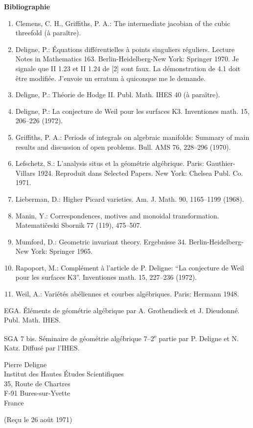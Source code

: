 \documentclass[10pt]{article}
\begin{document}
\begin{center}
\bfseries Bibliographie
\end{center}
\begin{enumerate}[label=\arabic*.]
\item Clemens, C. H., Griffiths, P. A.: The intermediate jacobian of the cubic threefold (à paraître).
\item Deligne, P.: Équations différentielles à points singuliers réguliers. Lecture Notes in Mathematics 163. Berlin-Heidelberg-New York: Springer 1970. Je signale que II 1.23 et II 1.24 de [2] sont faux. La démonstration de 4.1 doit être modifiée. J'envoie un erratum à quiconque me le demande.
\item Deligne, P.: Théorie de Hodge II. Publ. Math. IHES 40 (à paraître).
\item Deligne, P.: La conjecture de Weil pour les surfaces K3. Inventiones math. 15, 206--226 (1972).
\item Griffiths, P. A.: Periods of integrals on algebraic manifolds: Summary of main results and discussion of open problems. Bull. AMS 76, 228--296 (1970).
\item Lefschetz, S.: L'analysis situs et la géométrie algébrique. Paris: Gauthier-Villars 1924. Reproduit dans Selected Papers. New York: Chelsea Publ. Co. 1971.
\item Lieberman, D.: Higher Picard varieties. Am. J. Math. 90, 1165--1199 (1968).
\item Manin, Y.: Correspondences, motives and monoidal transformation. Matematičeski Sbornik 77 (119), 475--507.
\item Mumford, D.: Geometric invariant theory. Ergebnisse 34. Berlin-Heidelberg-New York: Springer 1965.
\item Rapoport, M.: Complément à l'article de P. Deligne: ``La conjecture de Weil pour les surfaces K3''. Inventiones math. 15, 227--236 (1972).
\item Weil, A.: Variétés abéliennes et courbes algébriques. Paris: Hermann 1948.
\end{enumerate}
\noindent EGA. Éléments de géométrie algébrique par A. Grothendieck et J. Dieudonné. Publ. Math. IHES.

\noindent SGA 7 bis. Séminaire de géométrie algébrique 7--2\textsuperscript{e} partie par P. Deligne et N. Katz. Diffusé par l'IHES.

\begin{flushright}
Pierre Deligne\\
Institut des Hautes Études Scientifiques\\
35, Route de Chartres\\
F-91 Bures-sur-Yvette\\
France
\end{flushright}

\begin{center}
(Reçu le 26 août 1971)
\end{center}
\end{document}
